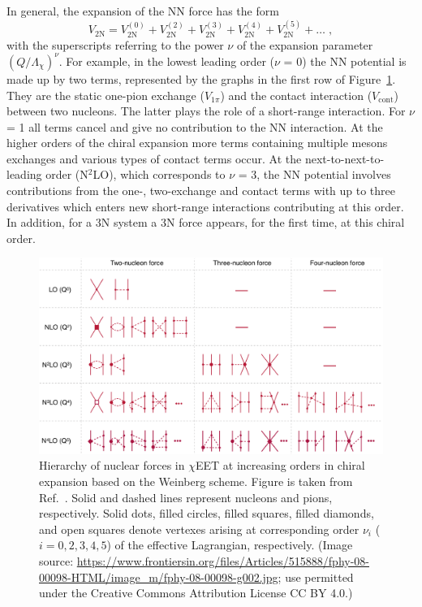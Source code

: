 In general, the expansion of the NN force has the form
\begin{equation}
V_{\mathrm{2N}} = V^{(0)}_{\mathrm{2N}} + V^{(2)}_{\mathrm{2N}} + V^{(3)}_{\mathrm{2N}} + V^{(4)}_{\mathrm{2N}} + V^{(5)}_{\mathrm{2N}} + \ldots\;,
\end{equation}
with the superscripts referring to the power $\nu$ of the expansion parameter $(Q/\Lambda_{\chi})^{\nu}$.
For example, in the lowest leading order ($\nu$ = 0) the NN potential is made up by two terms, represented by the graphs in the first row of Figure~\ref{hierarchy}. They are the static one-pion exchange ($V_{1\pi}$) and the contact interaction ($V_{\mathrm{cont}}$) between two nucleons. The latter plays the role of a short-range interaction. For $\nu$ = 1 all terms cancel and give no contribution to the NN interaction. At the higher orders of the chiral expansion more terms containing multiple mesons exchanges and various types of contact terms occur.
At the next-to-next-to-leading order (N$^{2}$LO), which corresponds to $\nu$ = 3, the NN potential involves contributions from the one-, two-exchange and contact terms with up to three derivatives which enters new short-range interactions contributing at this order. In addition, for a 3N system a 3N force appears, for the first time, at this chiral order.
\begin{figure}[h]
\begin{center}
\includegraphics[width=1\textwidth]{PhD-text/3_Potentials/chi_expan_nf_EE.png}
\end{center}
\caption{Hierarchy of nuclear forces in $\chi$EET at increasing orders in chiral expansion based on the Weinberg scheme. Figure is taken from Ref.~\cite{epelbaum2019high}. Solid and dashed lines represent nucleons and pions, respectively. Solid dots, filled circles, filled squares, filled diamonds, and open squares denote vertexes arising at corresponding order $\nu_{i}$ ($i = 0, 2, 3, 4, 5$) of the effective Lagrangian, respectively. (Image source: \url{https://www.frontiersin.org/files/Articles/515888/fphy-08-00098-HTML/image_m/fphy-08-00098-g002.jpg}; use permitted under the Creative Commons Attribution License CC BY 4.0.)}
\label{hierarchy}
\end{figure}
